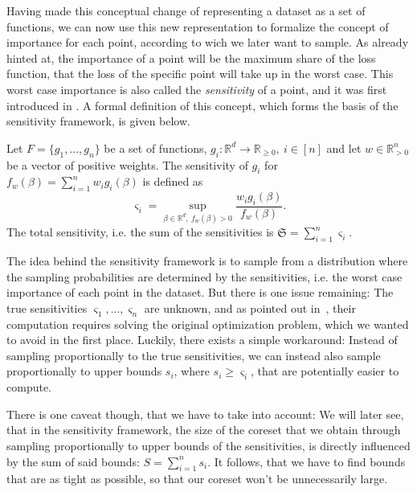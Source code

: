 Having made this conceptual change of representing a dataset as
a set of functions, we can now use this new representation to
formalize the concept of importance for each point, according
to wich we later want to sample.
As already hinted at, the importance of a point will be the
maximum share of the loss function, that the loss of the specific
point will take up in the worst case.
This worst case importance is also called the \textit{sensitivity}
of a point, and it was first introduced in
\cite{langberg-schulman-sensitivities}.
A formal definition of this concept, which forms
the basis of the sensitivity framework, is given below.

\begin{definition}
    \label{def:sensitivity}
    Let $F = \{ g_1, ..., g_n \}$ be a set of functions,
    $g_i: \mathbb{R}^d \rightarrow \mathbb{R}_{\geq 0}, \ i \in [n]$
    and let $w \in \mathbb{R}^n_{>0}$ be a vector of positive weights.
    The sensitivity of $g_i$ for $f_w(\beta) = \sum_{i=1}^n w_i g_i(\beta)$ is defined as
    \begin{equation*}
        \varsigma_i = \sup_{\beta \in \mathbb{R}^d, \ f_w(\beta) > 0} \frac{w_i g_i(\beta)}{f_w(\beta)}.
    \end{equation*}
    The total sensitivity, i.e. the sum of the sensitivities is $\mathfrak{S} = \sum_{i=1}^n \varsigma_i$.
\end{definition}

The idea behind the sensitivity framework is to sample from a
distribution where the sampling probabilities are determined by
the sensitivities, i.e. the worst case importance of each point
in the dataset.
But there is one issue remaining: The true sensitivities
$\varsigma_1, ..., \varsigma_n$ are unknown, and as
pointed out in~\cite{braverman-feldman-coresets}, their
computation requires solving the original optimization problem,
which we wanted to avoid in the first place.
Luckily, there exists a simple workaround:
Instead of sampling proportionally to the true sensitivities,
we can instead also sample proportionally to
upper bounds $s_i$, where $s_i \geq \varsigma_i$, that are
potentially easier to compute.

There is one caveat though, that we have to take into account:
We will later see, that in the sensitivity framework, the
size of the coreset that we obtain through sampling proportionally
to upper bounds of the sensitivities, is directly influenced
by the sum of said bounds: $S = \sum_{i=1}^n s_i$.
It follows, that we have to find bounds that are as tight as
possible, so that our coreset won't be unnecessarily large.

